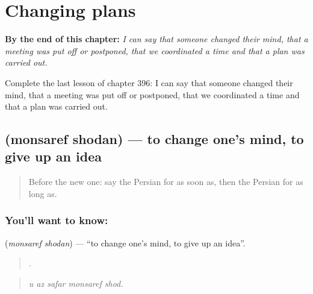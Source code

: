
\chapter{Changing plans}
\label{ch:fa-changing-plans}

\begin{chapteropening}
\textbf{By the end of this chapter:} \emph{I can say that someone changed their mind, that a meeting was put off or postponed, that we coordinated a time and that a plan was carried out.}

Complete the last lesson of chapter 396: I can say that someone changed their mind, that a meeting was put off or postponed, that we coordinated a time and that a plan was carried out.
\end{chapteropening}

\section[\texorpdfstring{\fa{منصرف} \fa{شدن} (monsaref shodan)}{منصرف شدن (monsaref shodan)}]{  (monsaref shodan) — to change one's mind, to give up an idea}

\label{lesson:FA-C396-monsaref-shodan}



\begin{quote}
Before the new one: say the Persian for as soon as, then the Persian for as long as.
\end{quote}

\subsection*{You'll want to know:  }
\textbf{ } (\emph{monsaref shodan}) — \textquotedblleft{}to change one's mind, to give up an idea\textquotedblright{}.

\begin{quote}
    .
\end{quote}

\begin{quote}
\emph{u az safar monsaref shod.}
\end{quote}

